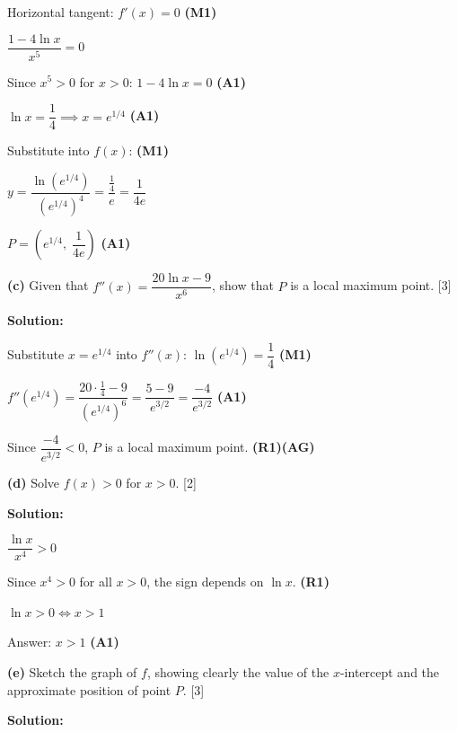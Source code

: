 \documentclass[12pt, twoside]{article}
\begin{document}
\begin{enumerate}[itemsep=0.3cm]
Horizontal tangent: $f'(x) = 0$ \hfill \textbf{(M1)}

$\dfrac{1 - 4\ln x}{x^5} = 0$

Since $x^5 > 0$ for $x > 0$: \quad $1 - 4\ln x = 0$ \hfill \textbf{(A1)}

$\ln x = \dfrac{1}{4} \implies x = e^{1/4}$ \hfill \textbf{(A1)}

Substitute into $f(x)$: \hfill \textbf{(M1)}

$y = \dfrac{\ln(e^{1/4})}{(e^{1/4})^4}
= \dfrac{\frac{1}{4}}{e} = \dfrac{1}{4e}$

$P = \left(e^{1/4},\; \dfrac{1}{4e}\right)$ \hfill \textbf{(A1)}

\bigskip

\textbf{(c)} Given that $f''(x) = \dfrac{20\ln x - 9}{x^6}$,
show that $P$ is a local maximum point. \hfill [3]

\textbf{Solution:}

Substitute $x = e^{1/4}$ into $f''(x)$:
\quad $\ln(e^{1/4}) = \dfrac{1}{4}$ \hfill \textbf{(M1)}

$f''(e^{1/4}) = \dfrac{20 \cdot \frac{1}{4} - 9}{(e^{1/4})^6}
= \dfrac{5 - 9}{e^{3/2}} = \dfrac{-4}{e^{3/2}}$ \hfill \textbf{(A1)}

Since $\dfrac{-4}{e^{3/2}} < 0$, $P$ is a local maximum point. \hfill \textbf{(R1)(AG)}

\bigskip

\textbf{(d)} Solve $f(x) > 0$ for $x > 0$. \hfill [2]

\textbf{Solution:}

$\dfrac{\ln x}{x^4} > 0$

Since $x^4 > 0$ for all $x > 0$, the sign depends on $\ln x$. \hfill \textbf{(R1)}

$\ln x > 0 \iff x > 1$

Answer: $x > 1$ \hfill \textbf{(A1)}

\newpage

\textbf{(e)} Sketch the graph of $f$, showing clearly the value of the
$x$-intercept and the approximate position of point $P$. \hfill [3]

\textbf{Solution:}

\begin{center}
\end{center}


\end{enumerate}
\end{document}
